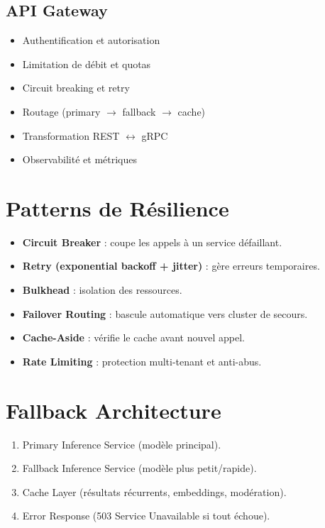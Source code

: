 \documentclass[12pt,a4paper]{report}
\begin{document}
\section{API Gateway}
\begin{itemize}
    \item Authentification et autorisation  
    \item Limitation de débit et quotas  
    \item Circuit breaking et retry  
    \item Routage (primary $\rightarrow$ fallback $\rightarrow$ cache)  
    \item Transformation REST $\leftrightarrow$ gRPC  
    \item Observabilité et métriques  
\end{itemize}

\chapter{Patterns de Résilience}
\begin{itemize}
    \item \textbf{Circuit Breaker} : coupe les appels à un service défaillant.  
    \item \textbf{Retry (exponential backoff + jitter)} : gère erreurs temporaires.  
    \item \textbf{Bulkhead} : isolation des ressources.  
    \item \textbf{Failover Routing} : bascule automatique vers cluster de secours.  
    \item \textbf{Cache-Aside} : vérifie le cache avant nouvel appel.  
    \item \textbf{Rate Limiting} : protection multi-tenant et anti-abus.  
\end{itemize}

\chapter{Fallback Architecture}
\begin{enumerate}
    \item Primary Inference Service (modèle principal).  
    \item Fallback Inference Service (modèle plus petit/rapide).  
    \item Cache Layer (résultats récurrents, embeddings, modération).  
    \item Error Response (503 Service Unavailable si tout échoue).  
\end{enumerate}
\end{document}
